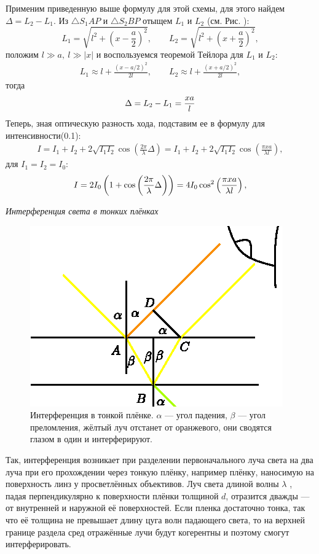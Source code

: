 ﻿\documentclass[__main__.tex]{subfiles}
\begin{document}
Применим приведенную выше формулу для этой схемы, для этого найдем $\Delta = L_2 - L_1$. Из
$\triangle S_1AP$ и $\triangle S_2BP$ отыщем $L_1$ и $L_2$ (см. Рис. ):
$$
L_1 = \sqrt{l^2 + \left(x-\frac{a}{2}\right)^2}, \qquad
L_2 = \sqrt{l^2 + \left(x+\frac{a}{2}\right)^2},
$$
положим $l \gg a, \ l \gg |x|$ и воспользуемся теоремой Тейлора для $L_1$ и $L_2$:
\begin{gather*}
L_1 \approx l + \frac{\left(x-a/2\right)^2}{2l}, \qquad
L_2 \approx l + \frac{\left(x+a/2\right)^2}{2l},
\end{gather*}
тогда
\begin{gather}
\llabel{o-02-schemediff}
\displaystyle \Delta = L_2 - L_1 = \frac{xa}{l}
\end{gather}
Теперь, зная оптическую разность хода, подставим ее в формулу для интенсивности(0.1):
\begin{gather*}
I = I_1 + I_2 + 2\sqrt{I_1 I_2}\cos\left(\frac{2\pi}{\lambda}\Delta\right) =
I_1 + I_2 + 2\sqrt{I_1 I_2}\cos\left(\frac{\pi x a}{\lambda l}\right),
\end{gather*}
для $I_1 = I_2 = I_0$:
\begin{gather}
\llabel{o-02-intensesch}
I = 2I_0\left(1 + \cos\left(\frac{2\pi}{\lambda}\Delta\right)\right) =
4I_0\cos^2\left(\frac{\pi xa}{\lambda l}\right),
\end{gather}

\textit{Интерференция света в тонких плёнках}\\
\begin{figure}[h]
	\includegraphics[width=1\linewidth]{img/o-05.eps}
	\caption{Интерференция в тонкой плёнке. $\alpha$ — угол падения, $\beta$ — угол преломления, жёлтый луч отстанет от оранжевого, они сводятся глазом в один и интерферируют.}
\end{figure}
Так, интерференция возникает при разделении первоначального луча света на два луча при его прохождении через тонкую плёнку, например плёнку, наносимую на поверхность линз у просветлённых объективов. Луч света длиной волны $\lambda$ , падая перпендикулярно к поверхности плёнки толщиной $d$, отразится дважды — от внутренней и наружной её поверхностей. Если пленка достаточно тонка, так что её толщина не превышает длину цуга волн падающего света, то на верхней границе раздела сред отражённые лучи будут когерентны и поэтому смогут интерферировать.
\end{document}
